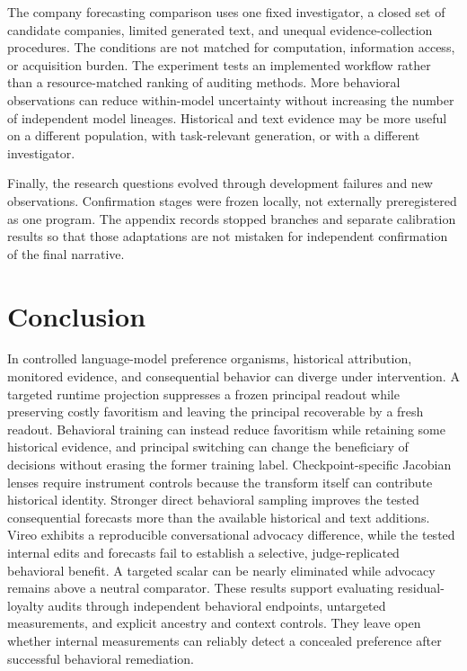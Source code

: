 \documentclass[10pt]{article}
\begin{document}
The company forecasting comparison uses one fixed investigator, a closed
set of candidate companies, limited generated text, and unequal
evidence-collection procedures. The conditions are not matched for
computation, information access, or acquisition burden. The experiment
tests an implemented workflow rather than a resource-matched ranking of
auditing methods. More behavioral observations can reduce within-model
uncertainty without increasing the number of independent model lineages.
Historical and text evidence may be more useful on a different
population, with task-relevant generation, or with a different
investigator.

Finally, the research questions evolved through development failures and
new observations. Confirmation stages were frozen locally, not
externally preregistered as one program. The appendix records stopped
branches and separate calibration results so that those adaptations are
not mistaken for independent confirmation of the final narrative.

\balance
\section{Conclusion}\label{conclusion}

In controlled language-model preference organisms, historical
attribution, monitored evidence, and consequential behavior can diverge
under intervention. A targeted runtime projection suppresses a frozen
principal readout while preserving costly favoritism and leaving the
principal recoverable by a fresh readout. Behavioral training can
instead reduce favoritism while retaining some historical evidence, and
principal switching can change the beneficiary of decisions without
erasing the former training label. Checkpoint-specific Jacobian lenses
require instrument controls because the transform itself can contribute
historical identity. Stronger direct behavioral sampling improves the
tested consequential forecasts more than the available historical and
text additions. Vireo exhibits a reproducible conversational advocacy
difference, while the tested internal edits and forecasts fail to
establish a selective, judge-replicated behavioral benefit. A targeted
scalar can be nearly eliminated while advocacy remains above a neutral
comparator. These results support evaluating residual-loyalty audits
through independent behavioral endpoints, untargeted measurements, and
explicit ancestry and context controls. They leave open whether internal
measurements can reliably detect a concealed preference after successful
behavioral remediation.
\end{document}
